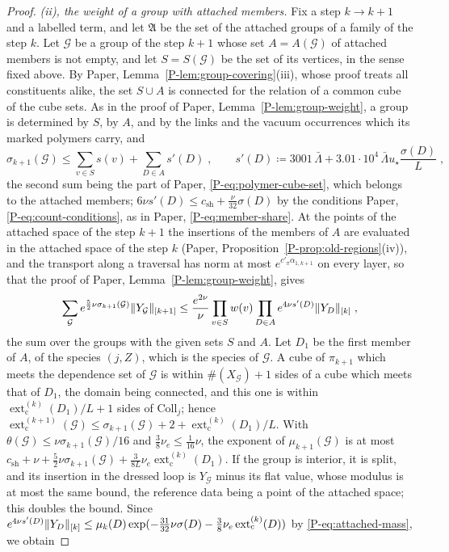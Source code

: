\documentclass[11pt]{preprint}
\DeclarePairedDelimiter{\norm}{\lVert}{\rVert}
\numberwithin{equation}{section}
\theoremstyle{definition}
\theoremstyle{remark}
\theoremstyle{plain}
\begin{document}
\begin{proof}
\emph{(ii), the weight of a group with attached members.} Fix a step $k \to k + 1$ and a labelled term, and let $\mathfrak A$ be the set of the attached groups of a family of the step $k$. Let $\mathcal G$ be a group of the step $k + 1$ whose set $A = A(\mathcal G)$ of attached members is not empty, and let $S = S(\mathcal G)$ be the set of its vertices, in the sense fixed above. By Paper, Lemma~\ref{P-lem:group-covering}(iii), whose proof treats all constituents alike, the set $S \cup A$ is connected for the relation of a common cube of the cube sets. As in the proof of Paper, Lemma~\ref{P-lem:group-weight}, a group is determined by $S$, by $A$, and by the links and the vacuum occurrences which its marked polymers carry, and
\[
    \sigma_{k+1}(\mathcal G) \leq \sum_{v \in S}s(v) + \sum_{D \in A}s'(D)\;,
    \qquad
    s'(D) \coloneqq 3001\,\bar\Lambda + 3.01 \cdot 10^4\,\bar\Lambda u_\star\frac{\sigma(D)}{L}\;,
\]
the second sum being the part of Paper, \eqref{P-eq:polymer-cube-set}, which belongs to the attached members; $6\nu s'(D) \leq c_{\mathrm{sh}} + \frac{\nu}{32}\sigma(D)$ by the conditions Paper, \eqref{P-eq:count-conditions}, as in Paper, \eqref{P-eq:member-share}. At the points of the attached space of the step $k + 1$ the insertions of the members of $A$ are evaluated in the attached space of the step $k$ (Paper, Proposition~\ref{P-prop:old-regions}(iv)), and the transport along a traversal has norm at most $e^{c'_\pi\alpha_{1,k+1}}$ on every layer, so that the proof of Paper, Lemma~\ref{P-lem:group-weight}, gives
\[
    \sum_{\mathcal G}e^{\frac52\nu\sigma_{k+1}(\mathcal G)}\norm{Y_{\mathcal G}}_{[k+1]} \leq \frac{e^{2\nu}}{\nu}\prod_{v \in S}w(v)\prod_{D \in A}e^{4\nu s'(D)}\norm{Y_D}_{[k]}\;,
\]
the sum over the groups with the given sets $S$ and $A$. Let $D_1$ be the first member of $A$, of the species $(j, Z)$, which is the species of $\mathcal G$. A cube of $\pi_{k+1}$ which meets the dependence set of $\mathcal G$ is within $\#(X_{\mathcal G}) + 1$ sides of a cube which meets that of $D_1$, the domain being connected, and this one is within $\operatorname{ext}^{(k)}_{\mathrm c}(D_1)/L + 1$ sides of $\mathrm{Coll}_j$; hence $\operatorname{ext}^{(k+1)}_{\mathrm c}(\mathcal G) \leq \sigma_{k+1}(\mathcal G) + 2 + \operatorname{ext}^{(k)}_{\mathrm c}(D_1)/L$. With $\theta(\mathcal G) \leq \nu\sigma_{k+1}(\mathcal G)/16$ and $\frac38\nu_e \leq \frac{1}{16}\nu$, the exponent of $\mu_{k+1}(\mathcal G)$ is at most $c_{\mathrm{sh}} + \nu + \frac52\nu\sigma_{k+1}(\mathcal G) + \frac{3}{8L}\nu_e\operatorname{ext}^{(k)}_{\mathrm c}(D_1)$. If the group is interior, it is split, and its insertion in the dressed loop is $Y_{\mathcal G}$ minus its flat value, whose modulus is at most the same bound, the reference data being a point of the attached space; this doubles the bound. Since $e^{4\nu s'(D)}\norm{Y_D}_{[k]} \leq \mu_k(D)\exp(-\frac{31}{32}\nu\sigma(D) - \frac38\nu_e\operatorname{ext}^{(k)}_{\mathrm c}(D))$ by \eqref{P-eq:attached-mass}, we obtain

\end{proof}
\end{document}
